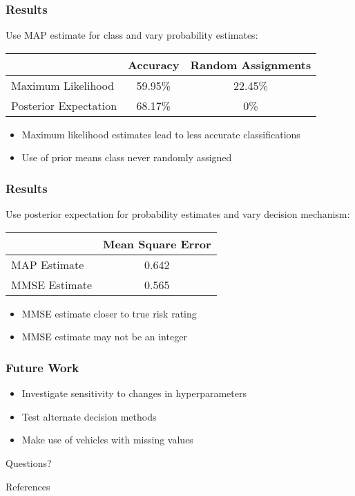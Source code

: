 \documentclass{beamer}
\begin{document}
\begin{frame}
	\frametitle{Results}
	Use MAP estimate for class and vary probability estimates:
	\begin{center}
		\begin{tabular}{ l|c c }
			                      & Accuracy & Random Assignments\\
			\hline
			Maximum Likelihood    & 59.95\%  & 22.45\% \\
			Posterior Expectation & 68.17\%  & 0\%
		\end{tabular}
	\end{center}
	\begin{itemize}
		\item Maximum likelihood estimates lead to less accurate classifications
		\item Use of prior means class never randomly assigned
	\end{itemize}
\end{frame}

\begin{frame}
	\frametitle{Results}
	Use posterior expectation for probability estimates and vary decision mechanism:
	\begin{center}
		\begin{tabular}{ l|c }
			              & Mean Square Error   \\
			\hline
			MAP Estimate  & 0.642 \\
			MMSE Estimate & 0.565
		\end{tabular}
	\end{center}
	\begin{itemize}
		\item MMSE estimate closer to true risk rating
		\item MMSE estimate may not be an integer
	\end{itemize}
\end{frame}

\begin{frame}
	\frametitle{Future Work}
	\begin{itemize}
		\item Investigate sensitivity to changes in hyperparameters
		\item Test alternate decision methods
		\item Make use of vehicles with missing values
	\end{itemize}
\end{frame}

\begin{frame}[standout]
	Questions?
\end{frame}

\begin{frame}[allowframebreaks]{References}

  
  

\end{frame}
 
\end{document}
